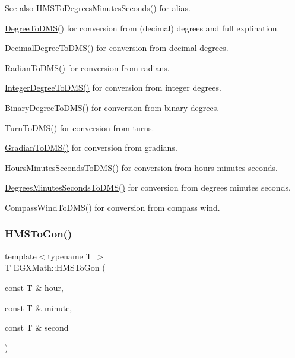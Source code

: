 \begin{DoxySeeAlso}{See also}
\mbox{\hyperlink{group___e_g_x_math-_angle_conversions-_h_m_s_ga7f694aec9b3e7cc9d94d510e27e4403f}{H\+M\+S\+To\+Degrees\+Minutes\+Seconds()}} for alias. 

\mbox{\hyperlink{group___e_g_x_math-_angle_conversions-_degree_ga1096d04647918e20f61fb184ba2a7dce}{Degree\+To\+D\+M\+S()}} for conversion from (decimal) degrees and full explination. 

\mbox{\hyperlink{group___e_g_x_math-_angle_conversions-_decimal_degree_ga64a1b298ce16e9edf3209b678a7bed46}{Decimal\+Degree\+To\+D\+M\+S()}} for conversion from decimal degrees. 

\mbox{\hyperlink{group___e_g_x_math-_angle_conversions-_radian_gaf80be0c5c65ccaa5544a08a7754f3575}{Radian\+To\+D\+M\+S()}} for conversion from radians. 

\mbox{\hyperlink{group___e_g_x_math-_angle_conversions-_integer_degree_gaf76779bcc23268b41d4c3a7610d60eaf}{Integer\+Degree\+To\+D\+M\+S()}} for conversion from integer degrees. 

Binary\+Degree\+To\+D\+M\+S() for conversion from binary degrees. 

\mbox{\hyperlink{group___e_g_x_math-_angle_conversions-_turn_ga6ca011c0ae55ae079402080d7a1b4010}{Turn\+To\+D\+M\+S()}} for conversion from turns. 

\mbox{\hyperlink{group___e_g_x_math-_angle_conversions-_gradian_ga0b6700b55ab4a24fa581bf2af0dafdaa}{Gradian\+To\+D\+M\+S()}} for conversion from gradians. 

\mbox{\hyperlink{group___e_g_x_math-_angle_conversions-_hours_minutes_seconds_ga8fe72f56eebb44d7e8d7033476bbdd9b}{Hours\+Minutes\+Seconds\+To\+D\+M\+S()}} for conversion from hours minutes seconds. 

\mbox{\hyperlink{group___e_g_x_math-_angle_conversions-_degrees_minutes_seconds_ga303b21c8ed41a718268bee6346a45be6}{Degrees\+Minutes\+Seconds\+To\+D\+M\+S()}} for conversion from degrees minutes seconds. 

Compass\+Wind\+To\+D\+M\+S() for conversion from compass wind. 
\end{DoxySeeAlso}
\mbox{\label{group___e_g_x_math-_angle_conversions-_h_m_s_ga7751b1ea9b1874096023286240a91068}} 
\subsubsection{\texorpdfstring{H\+M\+S\+To\+Gon()}{HMSToGon()}}
{\footnotesize\ttfamily template$<$typename T $>$ \\
T E\+G\+X\+Math\+::\+H\+M\+S\+To\+Gon (\begin{DoxyParamCaption}\item[{const T \&}]{hour,  }\item[{const T \&}]{minute,  }\item[{const T \&}]{second }\end{DoxyParamCaption})}



